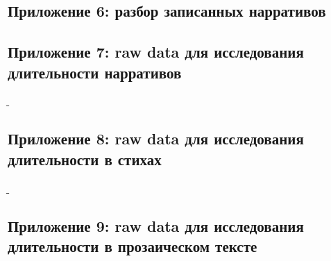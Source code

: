 \subsection{Приложение 6: разбор записанных нарративов} \label{corpus}

\pagebreak
\subsection{Приложение 7: raw data для исследования длительности нарративов} \label{corpus.raw}
̠
\subsection{Приложение 8: raw data для исследования длительности в стихах} \label{verse.raw}
̠
\subsection{Приложение 9: raw data для исследования длительности в прозаическом тексте} \label{prose.raw}


